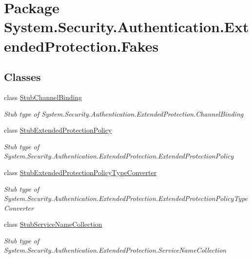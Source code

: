 \hypertarget{namespace_system_1_1_security_1_1_authentication_1_1_extended_protection_1_1_fakes}{\section{Package System.\-Security.\-Authentication.\-Extended\-Protection.\-Fakes}
\label{namespace_system_1_1_security_1_1_authentication_1_1_extended_protection_1_1_fakes}
}
\subsection*{Classes}
\begin{DoxyCompactItemize}
\item 
class \hyperlink{class_system_1_1_security_1_1_authentication_1_1_extended_protection_1_1_fakes_1_1_stub_channel_binding}{Stub\-Channel\-Binding}
\begin{DoxyCompactList}\small\item\em Stub type of System.\-Security.\-Authentication.\-Extended\-Protection.\-Channel\-Binding\end{DoxyCompactList}\item 
class \hyperlink{class_system_1_1_security_1_1_authentication_1_1_extended_protection_1_1_fakes_1_1_stub_extended_protection_policy}{Stub\-Extended\-Protection\-Policy}
\begin{DoxyCompactList}\small\item\em Stub type of System.\-Security.\-Authentication.\-Extended\-Protection.\-Extended\-Protection\-Policy\end{DoxyCompactList}\item 
class \hyperlink{class_system_1_1_security_1_1_authentication_1_1_extended_protection_1_1_fakes_1_1_stub_extendedf67afed15bbc0df07bfc91316f6f81f0}{Stub\-Extended\-Protection\-Policy\-Type\-Converter}
\begin{DoxyCompactList}\small\item\em Stub type of System.\-Security.\-Authentication.\-Extended\-Protection.\-Extended\-Protection\-Policy\-Type\-Converter\end{DoxyCompactList}\item 
class \hyperlink{class_system_1_1_security_1_1_authentication_1_1_extended_protection_1_1_fakes_1_1_stub_service_name_collection}{Stub\-Service\-Name\-Collection}
\begin{DoxyCompactList}\small\item\em Stub type of System.\-Security.\-Authentication.\-Extended\-Protection.\-Service\-Name\-Collection\end{DoxyCompactList}\end{DoxyCompactItemize}
